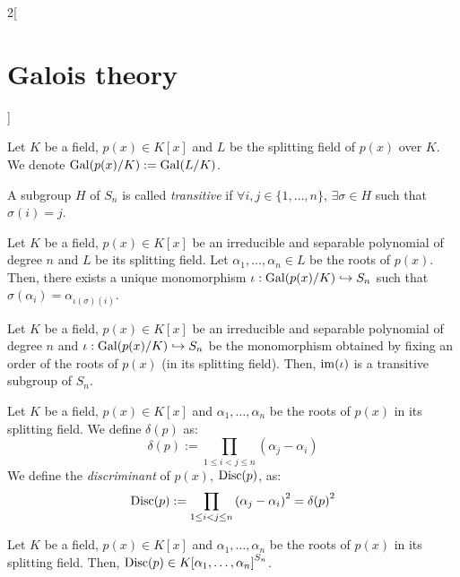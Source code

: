 \documentclass[../../../main.tex]{subfiles}
\begin{document}
\begin{multicols}{2}[\section{Galois theory}]
  \begin{center}
    \begin{minipage}{\linewidth}
      \centering
      
    \end{minipage}
  \end{center}
  \begin{definition}
    Let $K$ be a field, $p(x)\in K[x]$ and $L$ be the splitting field of $p(x)$ over $K$. We denote $\Gal(\quot{p(x)}{K}):=\Gal(\quot{L}{K})$.
  \end{definition}
  \begin{definition}
    A subgroup $H$ of $S_n$ is called \textit{transitive} if $\forall i,j\in\{1,\ldots,n\}$, $\exists \sigma\in H$ such that $\sigma(i)=j$.
  \end{definition}
  \begin{lemma}
    Let $K$ be a field, $p(x)\in K[x]$ be an irreducible and separable polynomial of degree $n$ and $L$ be its splitting field. Let $\alpha_1,\ldots,\alpha_n\in L$ be the roots of $p(x)$. Then, there exists a unique monomorphism $\iota: \Gal(\quot{p(x)}{K})\hookrightarrow S_n$ such that $\sigma(\alpha_i)=\alpha_{\iota(\sigma)(i)}$.
  \end{lemma}
  \begin{lemma}
    Let $K$ be a field, $p(x)\in K[x]$ be an irreducible and separable polynomial of degree $n$ and $\iota: \Gal(\quot{p(x)}{K})\hookrightarrow S_n$ be the monomorphism obtained by fixing an order of the roots of $p(x)$ (in its splitting field). Then, $\operatorname{im}(\iota)$ is a transitive subgroup of $S_n$.
  \end{lemma}
  \begin{definition}
    Let $K$ be a field, $p(x)\in K[x]$ and $\alpha_1,\ldots,\alpha_n$ be the roots of $p(x)$ in its splitting field. We define $\delta(p)$ as: $$\delta(p):=\prod_{1\leq i<j\leq n}(\alpha_j-\alpha_i)$$
    We define the \textit{discriminant} of $p(x)$, $\operatorname{Disc}(p)$, as: $$\operatorname{Disc}(p):=\prod_{1\leq i<j\leq n}{(\alpha_j-\alpha_i)}^2={\delta(p)}^2$$
  \end{definition}
  \begin{prop}
    Let $K$ be a field, $p(x)\in K[x]$ and $\alpha_1,\ldots,\alpha_n$ be the roots of $p(x)$ in its splitting field. Then, $\operatorname{Disc} (p)\in {K[\alpha_1,\ldots,\alpha_n]}^{S_n}$.
  \end{prop}
  \begin{lemma}

\end{lemma}
\end{multicols}
\end{document}
